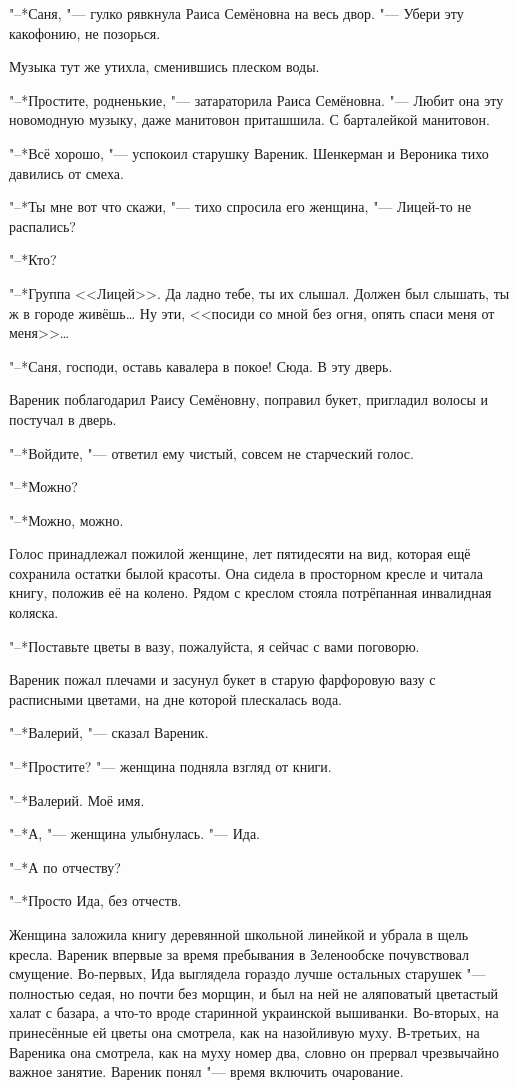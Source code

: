 "--*Саня, "--- гулко рявкнула Раиса Семёновна на весь двор.
"--- Убери эту какофонию, не позорься.

Музыка тут же утихла, сменившись плеском воды.

"--*Простите, родненькие, "--- затараторила Раиса Семёновна.
"--- Любит она эту новомодную музыку, даже манитовон приташшила.
С барталейкой манитовон.

"--*Всё хорошо, "--- успокоил старушку Вареник.
Шенкерман и Вероника тихо давились от смеха.

\asterism

\textspace

"--*Ты мне вот что скажи, "--- тихо спросила его женщина, "--- Лицей-то не распались?

"--*Кто?

"--*Группа <<Лицей>>.
Да ладно тебе, ты их слышал.
Должен был слышать, ты ж в городе живёшь\dots{}
Ну эти, <<посиди со мной без огня, опять спаси меня от меня>>\dots{}

"--*Саня, господи, оставь кавалера в покое!
Сюда.
В эту дверь.

Вареник поблагодарил Раису Семёновну, поправил букет, пригладил волосы и постучал в дверь.

"--*Войдите, "--- ответил ему чистый, совсем не старческий голос.

\asterism

"--*Можно?

"--*Можно, можно.

Голос принадлежал пожилой женщине, лет пятидесяти на вид, которая ещё сохранила остатки былой красоты.
Она сидела в просторном кресле и читала книгу, положив её на колено.
Рядом с креслом стояла потрёпанная инвалидная коляска.

"--*Поставьте цветы в вазу, пожалуйста, я сейчас с вами поговорю.

Вареник пожал плечами и засунул букет в старую фарфоровую вазу с расписными цветами, на дне которой плескалась вода.

"--*Валерий, "--- сказал Вареник.

"--*Простите? "--- женщина подняла взгляд от книги.

"--*Валерий.
Моё имя.

"--*А, "--- женщина улыбнулась.
"--- Ида.

"--*А по отчеству?

"--*Просто Ида, без отчеств.

Женщина заложила книгу деревянной школьной линейкой и убрала в щель кресла.
Вареник впервые за время пребывания в Зеленообске почувствовал смущение.
Во-первых, Ида выглядела гораздо лучше остальных старушек "--- полностью седая, но почти без морщин, и был на ней не аляповатый цветастый халат с базара, а что-то вроде старинной украинской вышиванки.
Во-вторых, на принесённые ей цветы она смотрела, как на назойливую муху.
В-третьих, на Вареника она смотрела, как на муху номер два, словно он прервал чрезвычайно важное занятие.
Вареник понял "--- время включить очарование.


